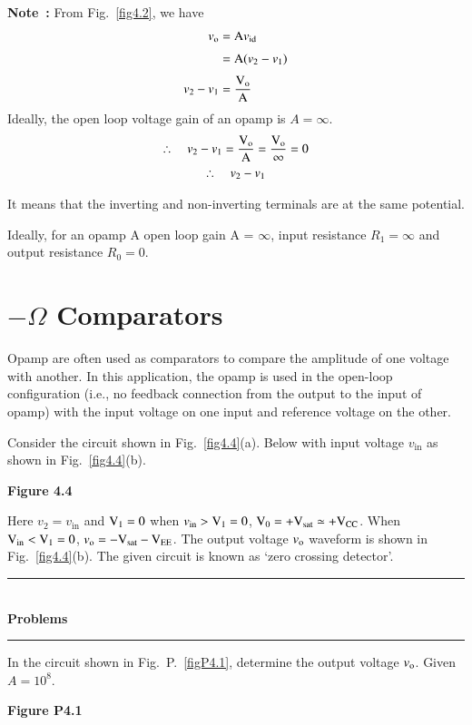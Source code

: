 \medskip
\noindent
{\bf Note~:} From Fig.~\ref{fig4.2}, we have
\begin{align*}
v_{\textrm{o}} &=\textrm{A} v_{\operatorname{id}}\\[3pt]
 &= \textrm{A} (v_{2}-v_{1})\\[3pt]
v_{2}-v_{1} &= \frac{\textrm{V}_{\textrm{o}}}{\textrm{A}}
\end{align*}
Ideally, the open loop voltage gain of an opamp is $A=\infty$.
\begin{gather*}
\therefore\quad v_{2}-v_{1}=\frac{\textrm{V}_{\textrm{o}}}{\textrm{A}}=\frac{\textrm{V}_{\textrm{o}}}{\infty}=0\\
\therefore\quad v_{2}-v_{1}
\end{gather*}

It means that the inverting and non-inverting terminals are at the same potential.

Ideally, for an opamp A open loop gain A = $\infty$, input resistance $R_{1}=\infty$ and output resistance $R_{0}=0$.

\section{\boldmath$-\Omega$ Comparators}\label{sec4.2}

Opamp are often used as comparators to compare the amplitude of one voltage with another. In this application, the opamp is used in the open-loop configuration (i.e., no feedback connection from the output to the input of opamp) with the input voltage on one input and reference voltage on the other.

Consider the circuit shown in Fig.~\ref{fig4.4}(a). Below with input voltage $v_{\text{in}}$ as shown in Fig.~\ref{fig4.4}(b).
\begin{center}
{\bf  Figure 4.4}
\end{center}

Here $v_{2}=v_{\text{in}}$ and $\textrm{V}_{1}=0$ when $v_{\text{in}}>\textrm{V}_{1}=0$, $\textrm{V}_{0}=+\textrm{V}_{\text{sat}}\simeq + \textrm{V}_{\text{CC}}$. When $\textrm{V}_{\text{in}}<\textrm{V}_{1}=0$, $v_{\textrm{o}}=-\textrm{V}_{\text{sat}}-\textrm{V}_{\text{EE}}$. The output voltage $v_{\textrm{o}}$ waveform is shown in Fig.~\ref{fig4.4}(b). The given circuit is known as `zero crossing detector'.

\begin{center}
\rule{4cm}{1pt}\\
{\bf\Large Problems}\\[-3pt]
\rule{4cm}{1pt}
\end{center}

\begin{problem}\label{prop4.1}
In the circuit shown in Fig.~P.~\ref{figP4.1}, determine the output voltage $v_{\textrm{o}}$. Given $A=10^{8}$.
\begin{center}
{\bf Figure P4.1}
\end{center}
\end{problem}

